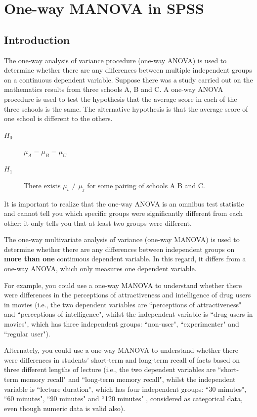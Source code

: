 \documentclass[a4paper,12pt]{article}
\begin{document}
	\Large
	
	\tableofcontents
	\newpage

\section{One-way MANOVA in SPSS}

\subsection{Introduction}
The one-way analysis of variance procedure (one-way ANOVA) is used to determine whether there are any differences between multiple independent groups on a continuous dependent variable. Suppose there was a study carried out on the mathematics results from three schools A, B and C. A one-way ANOVA procedure is used to test the hypothesis that the average score in each of the three schools is the same.
The alternative hypothesis is that the average score of one school is different to the others.
\begin{description}
\item[$H_0$] $\mu_A = \mu_B = \mu_C$
\item[$H_1$] There exists $\mu_i \neq \mu_j$ for some pairing of schools A B and C.
\end{description}
It is important to realize that the one-way ANOVA is an omnibus test statistic and cannot tell you which specific groups were significantly different from each other; it only tells you that at least two groups were different.

The one-way multivariate analysis of variance (one-way MANOVA) is used to determine whether there are any differences between independent groups on \textbf{more than one} continuous dependent variable. In this regard, it differs from a one-way ANOVA, which only measures one dependent variable.


For example, you could use a one-way MANOVA to understand whether there were differences in the perceptions of attractiveness and intelligence of drug users in movies (i.e., the two dependent variables are ``perceptions of attractiveness" and ``perceptions of intelligence", whilst the independent variable is ``drug users in movies", which has three independent groups: ``non-user", ``experimenter" and ``regular user").


Alternately, you could use a one-way MANOVA to understand whether there were differences in students' short-term and long-term recall of facts based on three different lengths of lecture (i.e., the two dependent variables are ``short-term memory recall" and ``long-term memory recall", whilst the independent variable is ``lecture duration", which has four independent groups: ``30 minutes", ``60 minutes", ``90 minutes" and ``120 minutes" , considered as categorical data, even though numeric data is valid also).
\end{document}
